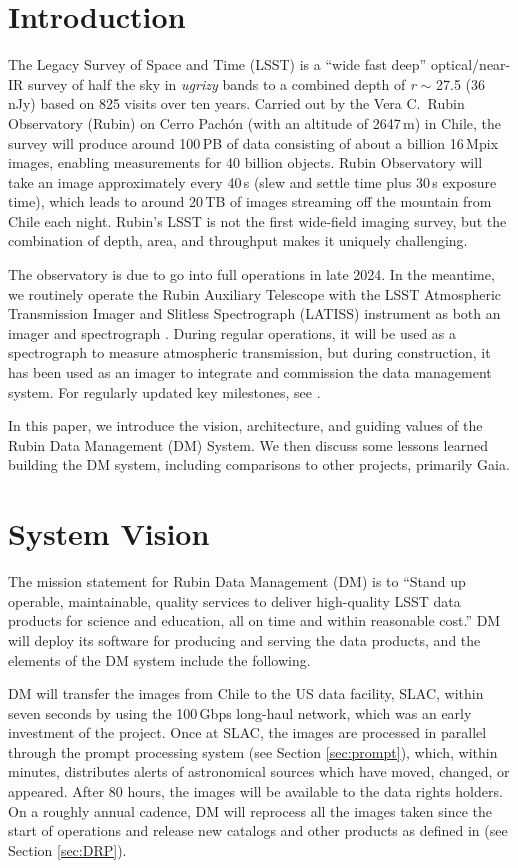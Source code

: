 \documentclass[11pt,twoside]{article}
\begin{document}
\section{Introduction}

The Legacy Survey of Space and Time (LSST) \citep{2019ApJ...873..111I} is a ``wide fast deep'' optical/near-IR survey of half the sky in \emph{ugrizy} bands to a combined depth of \emph{r} $\sim$ 27.5 (36\,nJy) based on 825 visits over ten years.
Carried out by the Vera C.\ Rubin Observatory (Rubin) on Cerro Pach\'{o}n (with an altitude of 2647\,m) in Chile, the survey will produce around 100\,PB of data consisting of about a billion 16\,Mpix images, enabling measurements for 40 billion objects.
Rubin Observatory will take an image approximately every 40\,s (slew and settle time plus 30\,s exposure time), which leads to around 20\,TB of images streaming off the mountain from Chile each night.
Rubin's LSST is not the first wide-field imaging survey, but the combination of depth, area, and throughput makes it uniquely challenging.

The observatory is due to go into full operations in late 2024.
In the meantime, we routinely operate the Rubin Auxiliary Telescope with the LSST Atmospheric Transmission Imager and Slitless Spectrograph (LATISS) instrument as both an imager and spectrograph \citep{2020SPIE11452E..0UI}.
During regular operations, it will be used as a spectrograph to measure atmospheric transmission, but during construction, it has been used as an imager to integrate and commission the data management system.
For regularly updated key milestones, see \citet{DMTN-232}.

In this paper, we introduce the vision, architecture, and guiding values of the Rubin Data Management (DM) System. We then discuss some lessons learned building the DM system, including comparisons to other projects, primarily Gaia.


\section{System Vision}

The mission statement for Rubin Data Management (DM) is to ``Stand up operable, maintainable, quality services to deliver high-quality LSST data products for science and education, all on time and within reasonable cost.'' DM will deploy its software for producing and serving the data products, and the elements of the DM system include the following.

DM will transfer the images from Chile to the US data facility, SLAC, within seven seconds by using the 100\,Gbps long-haul network, which was an early investment of the project.
Once at SLAC, the images are processed in parallel through the prompt processing system (see Section \ref{sec:prompt}), which, within minutes, distributes alerts of astronomical sources which have moved, changed, or appeared.
After 80 hours, the images will be available to the data rights holders.
On a roughly annual cadence, DM will reprocess all the images taken since the start of operations and release new catalogs and other products as defined in \citet{LSE-163} (see Section \ref{sec:DRP}).
\end{document}
